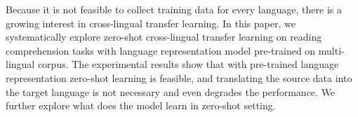 Because it is not feasible to collect training data for every language, there is a growing interest in cross-lingual transfer learning. In this paper, we systematically explore zero-shot cross-lingual transfer learning on reading comprehension tasks with language representation model pre-trained on multi-lingual corpus. The experimental results show that with pre-trained language representation zero-shot learning is feasible, and translating the source data into the target language is not necessary and even degrades the performance. We further explore what does the model learn in zero-shot setting.
